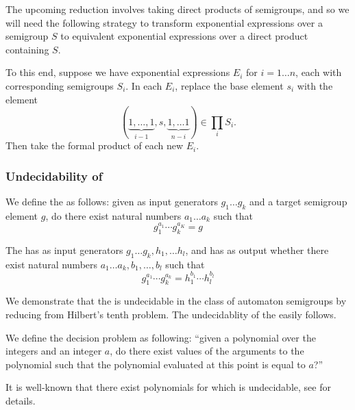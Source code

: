 \documentclass[11pt, titlepage]{article}
\begin{document}
The upcoming reduction involves taking direct products of semigroups,
and so we will need the following strategy to transform exponential
expressions over a semigroup $S$ to equivalent exponential expressions
over a direct product containing $S$.

To this end, suppose we have exponential expressions $E_i$ for
$i = 1\ldots n$, each with corresponding semigroups $S_i$. In each
$E_i$, replace the base element $s_i$ with the element
\[
  (\underbrace{1, \ldots, 1}_\text{$i-1$}, s,
   \underbrace{1, \ldots 1}_\text{$n-i$}) \in \prod_i S_i.
\]
Then take the formal product of each new $E_i$.

\subsubsection{Undecidability of }

\begin{definition}
  We define the  as follows: given as input
  generators $g_1 \ldots g_k$ and a target semigroup element $g$, do
  there exist natural numbers $a_1\ldots a_k$ such that
  \[ g_1^{a_1} \cdots g_k^{a_K} = g \]
\end{definition}

\begin{definition}
  The  has as input generators
  $g_1 \ldots g_k, h_1, \ldots h_l$, and has as output whether there
  exist natural numbers $a_1\ldots a_k, b_1, \ldots, b_l$ such that
  \[ g_1^{a_1} \cdots g_k^{a_k} = h_1^{b_1} \cdots h_l^{b_l} \]
\end{definition}

We demonstrate that the  is
undecidable in the class of automaton semigroups by reducing from
Hilbert's tenth problem. The undecidablity of the  easily follows.

\begin{definition}
  We define the decision problem  as following:
  ``given a polynomial over the integers and an integer $a$, do there
  exist values of the arguments to the polynomial such that the
  polynomial evaluated at this point is equal to $a$?''
\end{definition}

It is well-known that there exist polynomials for which
 is undecidable, see \cite{Matiyasevich:hilbert} for
details.
\end{document}
